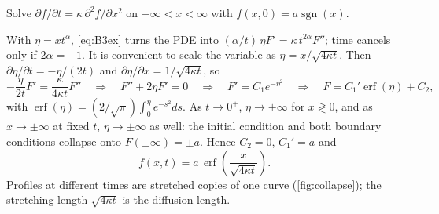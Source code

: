 \documentclass[11pt,letterpaper]{article}
\numberwithin{equation}{section}
\DeclareMathOperator{\erf}{erf}
\DeclareMathOperator{\sgn}{sgn}
\begin{document}
\begin{worked}\label{we:erf}
Solve $\partial f/\partial t=\kappa\,\partial^2 f/\partial x^2$ on $-\infty<x<\infty$ with $f(x,0)=a\sgn(x)$.

With $\eta=xt^{\alpha}$, \eqref{eq:B3ex} turns the PDE into $(\alpha/t)\,\eta F'=\kappa\,t^{2\alpha}F''$; time cancels only
if $2\alpha=-1$. It is convenient to scale the variable as $\eta=x/\sqrt{4\kappa t}$. Then
$\partial\eta/\partial t=-\eta/(2t)$ and $\partial\eta/\partial x=1/\sqrt{4\kappa t}$, so
\[
-\frac{\eta}{2t}F'=\frac{\kappa}{4\kappa t}F''\quad\Longrightarrow\quad F''+2\eta F'=0
\quad\Longrightarrow\quad F'=C_1e^{-\eta^2}\quad\Longrightarrow\quad F=C_1'\erf(\eta)+C_2,
\]
with $\erf(\eta)=(2/\sqrt\pi)\int_0^{\eta}e^{-s^2}ds$. As $t\to0^+$, $\eta\to\pm\infty$ for $x\gtrless0$, and as
$x\to\pm\infty$ at fixed $t$, $\eta\to\pm\infty$ as well: the initial condition and both boundary conditions collapse onto
$F(\pm\infty)=\pm a$. Hence $C_2=0$, $C_1'=a$ and
\begin{equation}\label{eq:erfsol}
f(x,t)=a\,\erf\!\left(\frac{x}{\sqrt{4\kappa t}}\right).
\end{equation}
Profiles at different times are stretched copies of one curve (\cref{fig:collapse}); the stretching length
$\sqrt{4\kappa t}$ is the diffusion length.
\end{worked}
\end{document}
